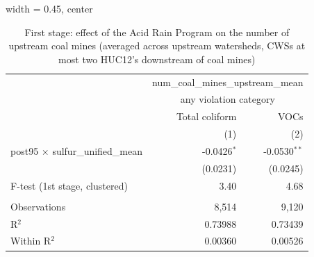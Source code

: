 
\begin{table}[htbp]
   
   \caption{\label{tab:fs_dwnstrm2step_nonminevio} First stage: effect of the Acid Rain Program on the number of upstream coal mines (averaged across upstream watersheds, CWSs at most two HUC12's downstream of coal mines)}
   \bigskip
   
   \centering
   
   \begin{adjustbox}{width = 0.45\textwidth, center}
      
      
      \begin{tabular}{lrr}
         \toprule
         
          & \multicolumn{2}{c}{num\_coal\_mines\_upstream\_mean}\\
         
          & \multicolumn{2}{c}{any violation category} \\ 
                                                  & Total coliform & VOCs \\   
         
                                                  & (1)            & (2)\\  
         
         \midrule 
         post95 $\times$ sulfur\_unified\_mean    & -0.0426$^{*}$  & -0.0530$^{**}$\\   
                                                  & (0.0231)       & (0.0245)\\   
         
         F-test (1st stage, clustered)            & 3.40           & 4.68\\  
         
          \\
         
         Observations                             & 8,514          & 9,120\\  
         R$^2$                                    & 0.73988        & 0.73439\\  
         Within R$^2$                             & 0.00360        & 0.00526\\  
         
         \bottomrule
         
      \end{tabular}
      
      

\end{adjustbox}
\end{table}
